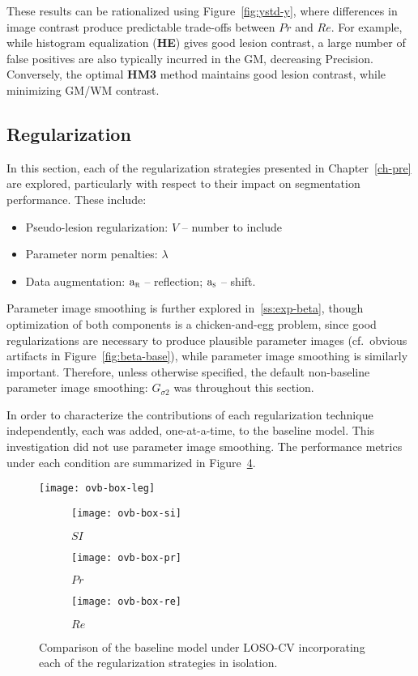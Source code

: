 These results can be rationalized using Figure~\ref{fig:ystd-y},
where differences in image contrast produce predictable trade-offs between $Pr$ and $Re$.%
For example, while histogram equalization (\textbf{HE}) gives good lesion contrast,
a large number of false positives are also typically incurred in the GM,
decreasing Precision.
Conversely, the optimal \textbf{HM3} method maintains good lesion contrast,
while minimizing GM/WM contrast.
\subsection{Regularization}\label{ss:exp-reg}
In this section, each of the regularization strategies
presented in Chapter~\ref{ch-pre} are explored,
particularly with respect to their impact on segmentation performance.
These include:
\begin{itemize}[itemsep=0pt,topsep=0pt]
  \item Pseudo-lesion regularization: $V$ -- number to include
  \item Parameter norm penalties: $\lambda$
  \item Data augmentation:
    $\mathrm{a}_{\textsc{r}}$ -- reflection;
    $\mathrm{a}_{\textsc{s}}$ -- shift.
\end{itemize}
Parameter image smoothing is further explored in~\ref{ss:exp-beta},
though optimization of both components is a chicken-and-egg problem,
since good regularizations are necessary to produce plausible parameter images
(cf.~obvious artifacts in Figure~\ref{fig:beta-base}),
while parameter image smoothing is similarly important.
Therefore, unless otherwise specified,
the default non-baseline parameter image smoothing: $G_{\sigma2}$ was throughout this section.
\par
In order to characterize the contributions of each regularization technique independently,
each was added, one-at-a-time, to the baseline model.
This investigation did not use parameter image smoothing.
The performance metrics under each condition are summarized in Figure~\ref{fig:seg-box-ovb}.
\par
\begin{figure}
  \centering
  \texttt{[image: ovb-box-leg]}\\[0.5em]
  \begin{subfigure}{0.32\textwidth}
    \centering\texttt{[image: ovb-box-si]}
    \caption{$SI$}%
    \label{fig:seg-box-ovb-si}
  \end{subfigure}
  \begin{subfigure}{0.32\textwidth}
    \centering\texttt{[image: ovb-box-pr]}
    \caption{$Pr$}%
    \label{fig:seg-box-ovb-pr}
  \end{subfigure}
  \begin{subfigure}{0.32\textwidth}
    \centering\texttt{[image: ovb-box-re]}
    \caption{$Re$}%
    \label{fig:seg-box-ovb-re}
  \end{subfigure}
  \caption{Comparison of the baseline model under LOSO-CV
    incorporating each of the regularization strategies in isolation.}%
  \label{fig:seg-box-ovb}
\end{figure}
